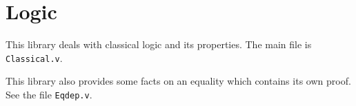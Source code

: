 \section{Logic}\label{Logic}

This library deals with classical logic and its properties.
The main file is {\tt Classical.v}.

This library also provides some facts on an equality which contains its
own proof. See the file {\tt Eqdep.v}.

